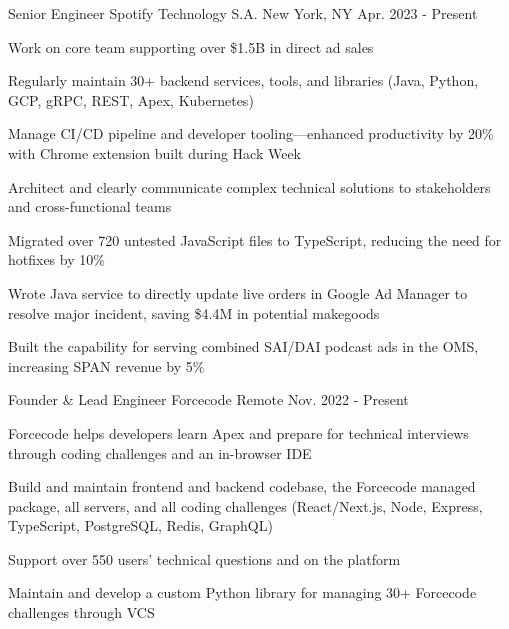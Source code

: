 

\begin{cventries}

  \cventry
    {Senior Engineer} %
    {Spotify Technology S.A.} %
    {New York, NY} %
    {Apr. 2023 - Present} %
    {
      \begin{cvitems} 
        \item {Work on core team supporting over \$1.5B in direct ad sales}
        \item {Regularly maintain 30+ backend services, tools, and libraries (Java, Python, GCP, gRPC, REST, Apex, Kubernetes)}
        \item {Manage CI/CD pipeline and developer tooling---enhanced productivity by 20\% with Chrome extension built during Hack Week}
        \item {Architect and clearly communicate complex technical solutions to stakeholders and cross-functional teams}
        \item {Migrated over 720 untested JavaScript files to TypeScript, reducing the need for hotfixes by 10\%}
        \item {Wrote Java service to directly update live orders in Google Ad Manager to resolve major incident, saving \$4.4M in potential makegoods}
        \item {Built the capability for serving combined SAI/DAI podcast ads in the OMS, increasing SPAN revenue by 5\%}
      \end{cvitems}
    }

  \cventry
    {Founder \& Lead Engineer} %
    {Forcecode} %
    {Remote} %
    {Nov. 2022 - Present} %
    {
      \begin{cvitems} %
        \item {Forcecode helps developers learn Apex and prepare for technical interviews through coding challenges and an in-browser IDE}
        \item {Build and maintain frontend and backend codebase, the Forcecode managed package, all servers, and all coding challenges (React/Next.js, Node, Express, TypeScript, PostgreSQL, Redis, GraphQL)}
        \item {Support over 550 users' technical questions and on the platform}
        \item {Maintain and develop a custom Python library for managing 30+ Forcecode challenges through VCS}
      \end{cvitems}
    }


\end{cventries}
